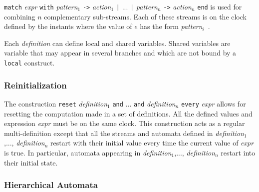 \documentclass[11pt,titlepage,twoside]{report}
\newcommand{\And}{\mbox{{\tt and}}}
\newcommand{\Reset}{\mbox{{\tt reset}}}
\newcommand{\Every}{\mbox{{\tt every}}}
\newcommand{\term}[1]{{\tt #1}}
\newcommand{\nterm}[1]{{\em #1}}
\begin{document}
\term{match} \nterm{expr} \term{with} \nterm{pattern}$_1$ \term{->}
\nterm{action}$_1$ \term{|} ... \term{|} \nterm{pattern}$_n$ \term{->}
\nterm{action}$_n$ \term{end} is used for combining $n$ complementary
sub-streams. Each of these streams is on the clock defined by the
instants where the value of $e$ has the form \nterm{pattern}$_i$\ .

Each \nterm{definition} can define local and shared variables.
Shared variables are variable that may appear in several branches and
which are not bound by a \term{local} construct.

\subsubsection{Reinitialization}
The construction \term{\Reset} \nterm{definition}$_1$ \term{\And} ...
\term{\And} \nterm{definition}$_n$ \term{\Every} \nterm{expr} allows
for resetting the computation made in a set of definitions. All the
defined values and expression \nterm{expr} must be on the same
clock. This construction acts as a regular multi-definition except
that all the streams and automata defined in
\nterm{definition}$_1$,..., \nterm{definition}$_n$ restart with their
initial value every time the current value of {\em expr} is true. In
particular, automata appearing in \nterm{definition}$_1$,...,
\nterm{definition}$_n$ restart into their initial state.

\subsubsection{Hierarchical Automata}
\end{document}
